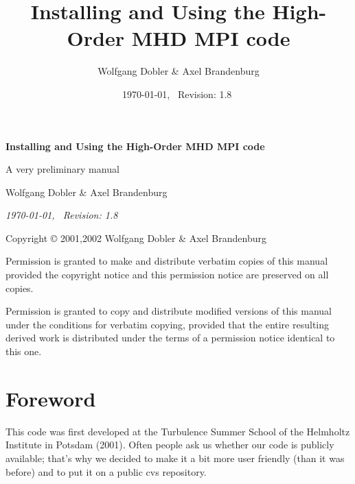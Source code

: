 \documentclass[12pt,twoside,notitlepage,a4paper]{article}
\title{{\sffamily\bfseries Installing and Using the High-Order MHD MPI code}}
\author{Wolfgang Dobler \& Axel Brandenburg}
\date{\today,~ $ $Revision: 1.8 $ $}
\begin{document}
\pagestyle{empty}


\begin{titlepage}
  \begin{center}

  \large

  \vspace*{3cm}

  {\Large\sffamily\bfseries Installing and Using the High-Order MHD MPI code}

  \vspace{0.5cm}

  {\sffamily A very preliminary manual}

  \vspace{1.5cm}

  {Wolfgang Dobler \& Axel Brandenburg}


  \vspace{2cm}

  \emph{\today,~ $ $Revision: 1.8 $ $}


\end{center}

\end{titlepage}


\newpage
\mbox{}
\vfill

Copyright \copyright{} 2001,2002 Wolfgang Dobler \& Axel Brandenburg
\bigskip

Permission is granted to make and distribute verbatim copies of
this manual provided the copyright notice and this permission notice
are preserved on all copies.

Permission is granted to copy and distribute modified versions
of this manual under the conditions for verbatim copying,
provided that the entire resulting derived work is distributed under the
terms of a permission notice identical to this one.


\clearpage
\pagestyle{plain}

\section*{Foreword}

This code was first developed at the Turbulence Summer School of the
Helmholtz Institute in Potsdam (2001).
Often people ask us whether our code is publicly available;
that's why we decided to make it a bit more user friendly (than it was before)
and to put it on a public cvs repository.
\end{document}
